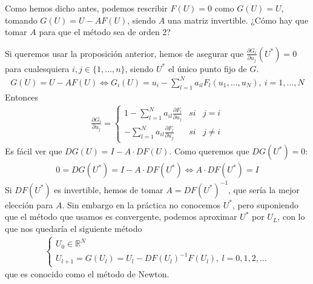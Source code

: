 \begin{obs}
    Como hemos dicho antes, podemos rescribir $F(U) = 0$ como $G(U) = U$, tomando $G(U) = U -AF(U)$, siendo $A$ una matriz invertible. ¿Cómo hay que tomar $A$ para que el método sea de orden 2?

    Si queremos usar la proposición anterior, hemos de asegurar que $\frac{\partial G_i}{\partial u_j}(U^*) = 0$ para cualesquiera $i,j \in \{1,\ldots,n\}$, siendo $U^*$ el único punto fijo de $G$.
    \begin{align*}
        G(U) = U - AF(U) \Longleftrightarrow G_i(U) = u_i - \sum_{l=1}^{N}a_{il}F_l(u_1,\ldots,u_N), \ i = 1,\ldots,N
    \end{align*}
    Entonces
    \begin{align*}
        \frac{\partial G_i}{\partial u_j} = \left\{ \begin{array}{lcc}
                                                        1 - \sum_{l=1}^{N} a_{il} \frac{\partial F_l}{\partial u_j} & si & j = i      \\
                                                        - \sum_{l=1}^{N} a_{il} \frac{\partial F_l}{\partial u_j}   & si & j \not = i
                                                    \end{array}
        \right.
    \end{align*}
    Es fácil ver que $DG(U) = I - A \cdot DF(U)$. Como queremos que $DG(U^*) = 0$:
    \begin{align*}
        0 = DG(U^*) = I - A \cdot DF(U^*) \Longleftrightarrow A \cdot DF(U^*) = I
    \end{align*}
    Si $DF(U^*)$ es invertible, hemos de tomar $A = DF(U^*)^{-1}$, que sería la mejor elección para $A$. Sin embargo en la práctica no conocemos $U^*$, pero suponiendo que el método que usamos es convergente, podemos aproximar $U^*$ por $U_L$, con lo que nos quedaría el siguiente método
    \begin{align*}
        \left\{ \begin{array}{lcc}
                    U_0 \in \mathbb{R}^N \\
                    U_{l+1} = G(U_l) = U_l - DF(U_l)^{-1} F(U_l), \ l = 0,1,2,\ldots
                \end{array}
        \right.
    \end{align*}
    que es conocido como el método de Newton.
\end{obs}

